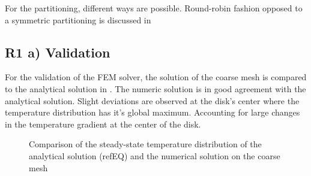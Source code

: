 For the partitioning, different ways are possible. Round-robin fashion opposed to a symmetric partitioning is discussed in 

\subsection{R1 a) Validation}
For the validation of the FEM solver, the solution of the coarse mesh is compared to the analytical solution  in . The numeric solution is in good agreement with the analytical solution. Slight deviations are observed at the disk's center where the temperature distribution has it's global maximum. Accounting for large changes in the temperature gradient at the center of the disk. 

\begin{figure}[!htbp]
	\centering
	\leavevmode
	\resizebox{0.8\width}{!}{}
	\caption{Comparison of the steady-state temperature distribution of the analytical solution (refEQ) and the numerical solution on the coarse mesh}
	\label{fig::TemperatureDist}
\end{figure}
